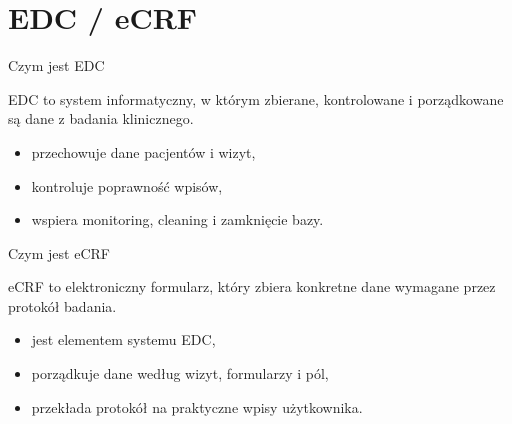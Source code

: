 \section{EDC / eCRF}


\begin{frame}{Czym jest EDC}
  \begin{DefinitionBox}
    EDC to system informatyczny, w którym zbierane, kontrolowane i porządkowane są dane z badania klinicznego.
  \end{DefinitionBox}

  \vspace{0.15cm}

  \begin{itemize}
    \item przechowuje dane pacjentów i wizyt,
    \item kontroluje poprawność wpisów,
    \item wspiera monitoring, cleaning i zamknięcie bazy.
  \end{itemize}
\end{frame}

\begin{frame}{Czym jest eCRF}
  \begin{DefinitionBox}
    eCRF to elektroniczny formularz, który zbiera konkretne dane wymagane przez protokół badania.
  \end{DefinitionBox}

  \vspace{0.35cm}

  \begin{itemize}
    \item jest elementem systemu EDC,
    \item porządkuje dane według wizyt, formularzy i pól,
    \item przekłada protokół na praktyczne wpisy użytkownika.
  \end{itemize}
\end{frame}

